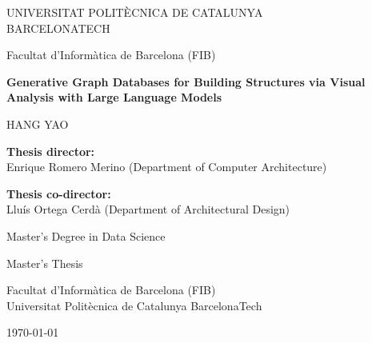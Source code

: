 \documentclass[12pt,a4paper,openright]{report}
\begin{document}
\begin{titlepage}
    \centering
    \vspace*{1cm}
    {\large UNIVERSITAT POLITÈCNICA DE CATALUNYA \\ BARCELONATECH \par}
    \vspace{0.4cm}
    {\large Facultat d'Informàtica de Barcelona (FIB)\par}

    \vspace{3.5cm}

    {\Large\bfseries Generative Graph Databases for Building Structures via Visual Analysis with Large Language Models\par}

    \vspace{2.5cm}

    {\large HANG YAO\par}

    \vspace{2cm}

    \begin{center}
        \textbf{Thesis director:} \\
        Enrique Romero Merino (Department of Computer Architecture)

        \vspace{0.6cm}
        
        \textbf{Thesis co-director:} \\
        Lluís Ortega Cerdà (Department of Architectural Design)
    \end{center}

    \vfill

    {\large Master's Degree in Data Science\par}
    \vspace{0.4cm}
    {\large Master's Thesis\par}
    \vspace{0.4cm}
    {\large Facultat d'Informàtica de Barcelona (FIB)\\
            Universitat Politècnica de Catalunya \textendash{} BarcelonaTech\par}
    \vspace{0.6cm}
    {\large \today\par}
\end{titlepage}

\setcounter{page}{1}
\end{document}
